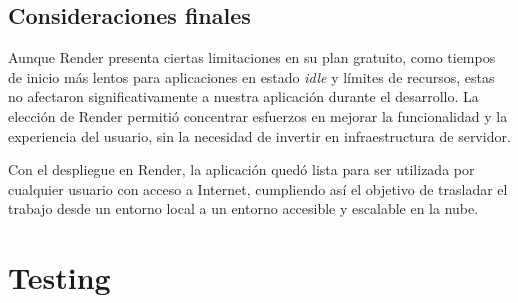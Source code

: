 \subsection{Consideraciones finales}

Aunque Render presenta ciertas limitaciones en su plan gratuito, como tiempos de inicio más lentos para aplicaciones en estado \textit{idle} y límites de recursos, estas no afectaron significativamente a nuestra aplicación durante el desarrollo. La elección de Render permitió concentrar esfuerzos en mejorar la funcionalidad y la experiencia del usuario, sin la necesidad de invertir en infraestructura de servidor.

Con el despliegue en Render, la aplicación quedó lista para ser utilizada por cualquier usuario con acceso a Internet, cumpliendo así el objetivo de trasladar el trabajo desde un entorno local a un entorno accesible y escalable en la nube.

\section{Testing}


